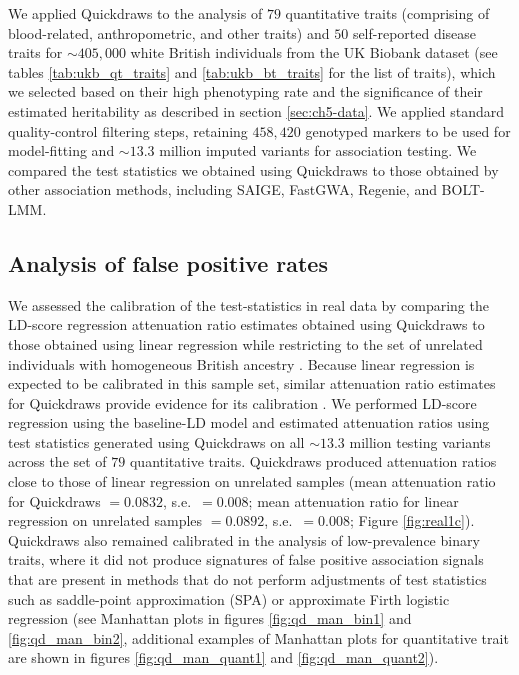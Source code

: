 We applied Quickdraws to the analysis of $79$ quantitative traits (comprising of blood-related, anthropometric, and other traits) and $50$ self-reported disease traits for ${\sim}405{,}000$ white British individuals from the UK Biobank dataset (see tables \ref{tab:ukb_qt_traits} and \ref{tab:ukb_bt_traits} for the list of traits), which we selected based on their high phenotyping rate and the significance of their estimated heritability as described in section \ref{sec:ch5-data}.
%
We applied standard quality-control filtering steps, retaining $458{,}420$ genotyped markers to be used for model-fitting and ${\sim}13.3$ million imputed variants for association testing.
%
We compared the test statistics we obtained using Quickdraws to those obtained by other association methods, including SAIGE, FastGWA, Regenie, and BOLT-LMM.
%

\subsection{Analysis of false positive rates}
%
We assessed the calibration of the test-statistics in real data by comparing the LD-score regression attenuation ratio estimates \cite{loh2018mixed} obtained using Quickdraws to those obtained using linear regression while restricting to the set of unrelated individuals with homogeneous British ancestry \cite{bycroft2018uk}.
%
Because linear regression is expected to be calibrated in this sample set, similar attenuation ratio estimates for Quickdraws provide evidence for its calibration \cite{loh2018mixed,jiang2019resource}.
%
We performed LD-score regression using the baseline-LD model \cite{gazal2017linkage} and estimated attenuation ratios using test statistics generated using Quickdraws on all ${\sim}13.3$ million testing variants across the set of $79$ quantitative traits.
%
Quickdraws produced attenuation ratios close to those of linear regression on unrelated samples (mean attenuation ratio for Quickdraws $ = 0.0832$, s.e.\ $= 0.008$; mean attenuation ratio for linear regression on unrelated samples $= 0.0892$, s.e.\ $= 0.008$; Figure \ref{fig:real1c}). 
%
Quickdraws also remained calibrated in the analysis of low-prevalence binary traits, where it did not produce signatures of false positive association signals that are present in methods that do not perform adjustments of test statistics such as saddle-point approximation (SPA) \cite{zhou2018efficiently} or approximate Firth logistic regression \cite{mbatchou2021computationally} (see Manhattan plots in figures \ref{fig:qd_man_bin1} and \ref{fig:qd_man_bin2}, additional examples of Manhattan plots for quantitative trait are shown in figures \ref{fig:qd_man_quant1} and  \ref{fig:qd_man_quant2}).
%

